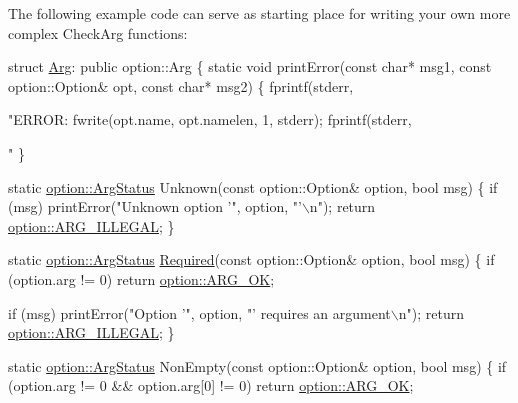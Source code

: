 The following example code can serve as starting place for writing your own more complex Check\-Arg functions\-: 
\begin{DoxyCode}
\textcolor{keyword}{struct }\hyperlink{class_arg}{Arg}: \textcolor{keyword}{public} option::Arg
\{
  \textcolor{keyword}{static} \textcolor{keywordtype}{void} printError(\textcolor{keyword}{const} \textcolor{keywordtype}{char}* msg1, \textcolor{keyword}{const} option::Option& opt, \textcolor{keyword}{const} \textcolor{keywordtype}{
      char}* msg2)
  \{
    fprintf(stderr, \textcolor{stringliteral}{"ERROR: %
    fwrite(opt.name, opt.namelen, 1, stderr);
    fprintf(stderr, \textcolor{stringliteral}{"%
  \}

  \textcolor{keyword}{static} \hyperlink{namespace_option_parser_ad237d47d58c66dea8dcf4f53ac11a6e4}{option::ArgStatus} Unknown(\textcolor{keyword}{const} option::Option& 
      option, \textcolor{keywordtype}{bool} msg)
  \{
    \textcolor{keywordflow}{if} (msg) printError(\textcolor{stringliteral}{"Unknown option '"}, option, \textcolor{stringliteral}{"'\(\backslash\)n"});
    \textcolor{keywordflow}{return} \hyperlink{namespace_option_parser_ad237d47d58c66dea8dcf4f53ac11a6e4a6ea016ff6334ed0d2ec885e96a76c472}{option::ARG\_ILLEGAL};
  \}

  \textcolor{keyword}{static} \hyperlink{namespace_option_parser_ad237d47d58c66dea8dcf4f53ac11a6e4}{option::ArgStatus} \hyperlink{struct_option_parser_1_1_arg_a499af2667b09f9f7f9fa9547dcd36e59}{Required}(\textcolor{keyword}{const} 
      option::Option& option, \textcolor{keywordtype}{bool} msg)
  \{
    \textcolor{keywordflow}{if} (option.arg != 0)
      \textcolor{keywordflow}{return} \hyperlink{namespace_option_parser_ad237d47d58c66dea8dcf4f53ac11a6e4a30360cae1c7e0b0230dc5cca30aaad4e}{option::ARG\_OK};

    \textcolor{keywordflow}{if} (msg) printError(\textcolor{stringliteral}{"Option '"}, option, \textcolor{stringliteral}{"' requires an argument\(\backslash\)n"});
    \textcolor{keywordflow}{return} \hyperlink{namespace_option_parser_ad237d47d58c66dea8dcf4f53ac11a6e4a6ea016ff6334ed0d2ec885e96a76c472}{option::ARG\_ILLEGAL};
  \}

  \textcolor{keyword}{static} \hyperlink{namespace_option_parser_ad237d47d58c66dea8dcf4f53ac11a6e4}{option::ArgStatus} NonEmpty(\textcolor{keyword}{const} option::Option& 
      option, \textcolor{keywordtype}{bool} msg)
  \{
    \textcolor{keywordflow}{if} (option.arg != 0 && option.arg[0] != 0)
      \textcolor{keywordflow}{return} \hyperlink{namespace_option_parser_ad237d47d58c66dea8dcf4f53ac11a6e4a30360cae1c7e0b0230dc5cca30aaad4e}{option::ARG\_OK};

}}
\end{DoxyCode}
